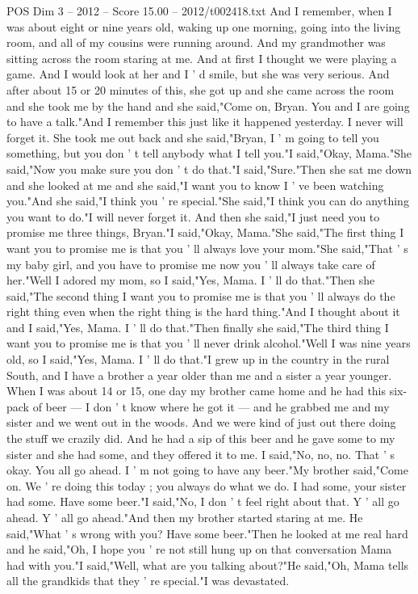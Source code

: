 \begin{textsample}{POS Dim 3 – 2012 – Score 15.00 – 2012/t002418.txt}
And I remember, when I was about eight or nine years old, waking up one morning, going into the living room, and all of my cousins were running around.
And my grandmother was sitting across the room staring at me.
And at first I thought we were playing a game.
And I would look at her and I ' d smile, but she was very serious.
And after about 15 or 20 minutes of this, she got up and she came across the room and she took me by the hand and she said,"Come on, Bryan.
You and I are going to have a talk."And I remember this just like it happened yesterday.
I never will forget it.
She took me out back and she said,"Bryan, I ' m going to tell you something, but you don ' t tell anybody what I tell you."I said,"Okay, Mama."She said,"Now you make sure you don ' t do that."I said,"Sure."Then she sat me down and she looked at me and she said,"I want you to know I ' ve been watching you."And she said,"I think you ' re special."She said,"I think you can do anything you want to do."I will never forget it.
And then she said,"I just need you to promise me three things, Bryan."I said,"Okay, Mama."She said,"The first thing I want you to promise me is that you ' ll always love your mom."She said,"That ' s my baby girl, and you have to promise me now you ' ll always take care of her."Well I adored my mom, so I said,"Yes, Mama.
I ' ll do that."Then she said,"The second thing I want you to promise me is that you ' ll always do the right thing even when the right thing is the hard thing."And I thought about it and I said,"Yes, Mama.
I ' ll do that."Then finally she said,"The third thing I want you to promise me is that you ' ll never drink alcohol."Well I was nine years old, so I said,"Yes, Mama.
I ' ll do that."I grew up in the country in the rural South, and I have a brother a year older than me and a sister a year younger.
When I was about 14 or 15, one day my brother came home and he had this six-pack of beer — I don ' t know where he got it — and he grabbed me and my sister and we went out in the woods.
And we were kind of just out there doing the stuff we crazily did.
And he had a sip of this beer and he gave some to my sister and she had some, and they offered it to me.
I said,"No, no, no.
That ' s okay.
You all go ahead.
I ' m not going to have any beer."My brother said,"Come on.
We ' re doing this today ; you always do what we do.
I had some, your sister had some.
Have some beer."I said,"No, I don ' t feel right about that.
Y ' all go ahead.
Y ' all go ahead."And then my brother started staring at me.
He said,"What ' s wrong with you?
Have some beer."Then he looked at me real hard and he said,"Oh, I hope you ' re not still hung up on that conversation Mama had with you."I said,"Well, what are you talking about?"He said,"Oh, Mama tells all the grandkids that they ' re special."I was devastated.

\end{textsample}
